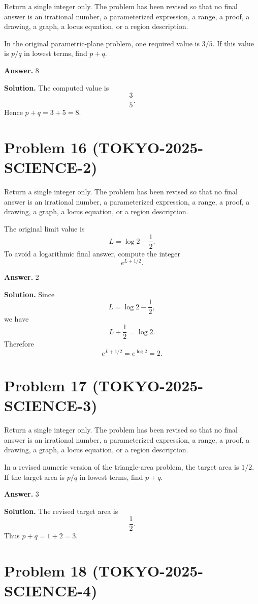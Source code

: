 \documentclass[11pt]{article}
\begin{document}
Return a single integer only. The problem has been revised so that no final answer is an irrational number, a parameterized expression, a range, a proof, a drawing, a graph, a locus equation, or a region description.

In the original parametric-plane problem, one required value is \(3/5\). If this
value is \(p/q\) in lowest terms, find \(p+q\).


\textbf{Answer.} 8


\textbf{Solution.}
The computed value is
\[
\frac35.
\]
Hence \(p+q=3+5=8\).


\section*{Problem 16 (TOKYO-2025-SCIENCE-2)}

Return a single integer only. The problem has been revised so that no final answer is an irrational number, a parameterized expression, a range, a proof, a drawing, a graph, a locus equation, or a region description.

The original limit value is
\[
L=\log 2-\frac12.
\]
To avoid a logarithmic final answer, compute the integer
\[
e^{L+1/2}.
\]


\textbf{Answer.} 2


\textbf{Solution.}
Since
\[
L=\log2-\frac12,
\]
we have
\[
L+\frac12=\log2.
\]
Therefore
\[
e^{L+1/2}=e^{\log2}=2.
\]


\section*{Problem 17 (TOKYO-2025-SCIENCE-3)}

Return a single integer only. The problem has been revised so that no final answer is an irrational number, a parameterized expression, a range, a proof, a drawing, a graph, a locus equation, or a region description.

In a revised numeric version of the triangle-area problem, the target area is
\(1/2\). If the target area is \(p/q\) in lowest terms, find \(p+q\).


\textbf{Answer.} 3


\textbf{Solution.}
The revised target area is
\[
\frac12.
\]
Thus \(p+q=1+2=3\).


\section*{Problem 18 (TOKYO-2025-SCIENCE-4)}
\end{document}
